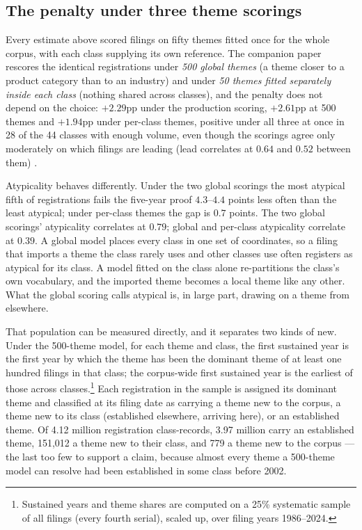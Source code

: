 \subsection{The penalty under three theme scorings}\label{sec:three_scorings}

Every estimate above scored filings on fifty themes fitted once for the
whole corpus, with each class supplying its own reference. The companion
paper rescores the identical registrations under \emph{500 global themes}
(a theme closer to a product category than to an industry) and under
\emph{50 themes fitted separately inside each class} (nothing shared
across classes), and the penalty does not depend on the choice: $+2.29$pp
under the production scoring, $+2.61$pp at 500 themes and $+1.94$pp
under per-class themes, positive under all three at once in 28 of the 44
classes with enough volume, even though the scorings agree only
moderately on which filings are leading (lead correlates at $0.64$ and
$0.52$ between them) \citep{SilverCorpus2026}.

Atypicality behaves differently.
Under the two global scorings the most atypical fifth of registrations
fails the five-year proof $4.3$--$4.4$ points less often than the least
atypical; under per-class themes the gap is $0.7$ points. The two global
scorings' atypicality correlates at $0.79$; global and per-class
atypicality correlate at $0.39$. A global model places every class in one
set of coordinates, so a filing that imports a theme the class rarely uses
and other classes use often registers as atypical for its class. A model
fitted on the class alone re-partitions the class's own vocabulary, and
the imported theme becomes a local theme like any other. What the global
scoring calls atypical is, in large part, drawing on a theme from
elsewhere.

That population can be measured directly, and it separates two kinds of
new. Under the 500-theme model, for each theme and class, the first
sustained year is the first year by which the theme has been the dominant
theme of at least one hundred filings in that class; the corpus-wide first
sustained year is the earliest of those across classes.\footnote{Sustained
years and theme shares are computed on a 25\% systematic sample of all
filings (every fourth serial), scaled up, over filing years 1986--2024.}
Each registration in the sample is assigned its dominant theme and
classified at its filing date as carrying a theme new to the corpus, a
theme new to its class (established elsewhere, arriving here), or an
established theme. Of 4.12 million registration class-records, 3.97
million carry an established theme, 151{,}012 a theme new to their class,
and 779 a theme new to the corpus --- the last too few to support a
claim, because almost every theme a 500-theme model can resolve had been
established in some class before 2002.

